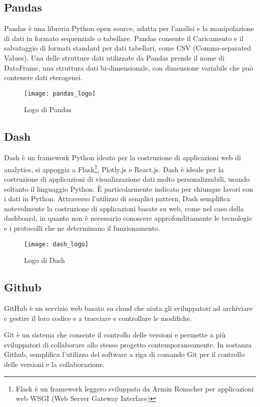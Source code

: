 \subsection{Pandas}
Pandas è una libreria Python open source, adatta per l’analisi e la manipolazione di dati in formato sequenziale o tabellare.
Pandas consente il Caricamento e il salvataggio di formati standard per dati tabellari, come CSV (Comma-separated Values).
Una delle strutture dati utilizzate da Pandas prende il nome di DataFrame, una struttura dati bi-dimensionale, con dimensione variabile che può contenere dati eterogenei.
\begin{figure}[htp]
    \centering
    \texttt{[image: pandas\_logo]}
    \caption{Logo di Pandas}
\end{figure}

\subsection{Dash}
Dash è un framework Python ideato per la costruzione di applicazioni web di analytics, si appoggia a Flask\footnote{Flask è un framework leggero sviluppato da Armin Ronacher per applicazioni web WSGI
(Web Server Gateway Interface)}, Plotly.js e React.js\footnotemark.
Dash è ideale per la costruzione di applicazioni di visualizzazione dati molto personalizzabili, usando soltanto il linguaggio Python. 
È particolarmente indicato per chiunque lavori con i dati in Python.
Attraverso l’utilizzo di semplici pattern, Dash semplifica notevolmente la costruzione di applicazioni basate su web, come nel caso della dashboard, in quanto non è necessario conoscere approfonditamente le tecnologie e i protocolli che ne determinano il funzionamento.

\begin{figure}[htp]
    \centering
    \texttt{[image: dash\_logo]}
    \caption{Logo di Dash}
\end{figure}


\subsection{Github}
GitHub è un servizio web basato su cloud che aiuta gli sviluppatori ad archiviare e gestire il loro codice e a tracciare e controllare le modifiche.

Git è un sistema che consente il controllo delle versioni e permette a più sviluppatori di collaborare allo stesso progetto contemporaneamente.
In sostanza Github, semplifica l’utilizzo del software a riga di comando Git per il controllo delle versioni e la collaborazione.

